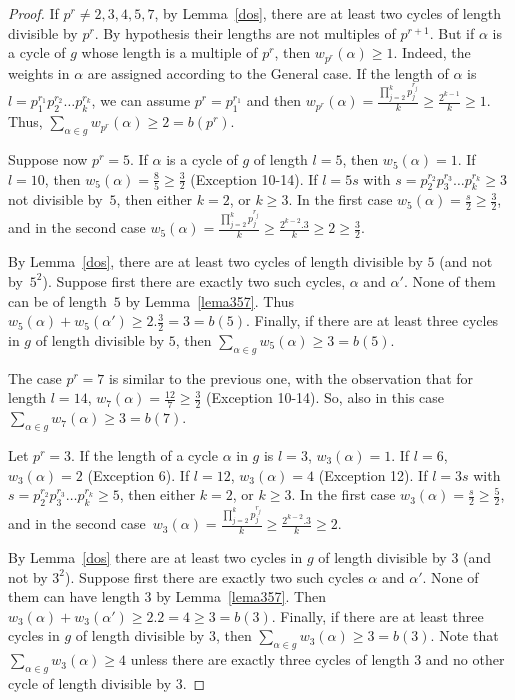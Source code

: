 \documentclass[10pt,a4paper]{amsart}
\renewcommand{\sigma}{g}
\theoremstyle{plain}
\theoremstyle{definition}
\theoremstyle{remark}
\begin{document}
\begin{proof}
If $p^r\neq 2,3,4,5,7$, by Lemma~\ref{dos}, there are at least two cycles of length divisible by $p^r$. By hypothesis their lengths are not multiples of $p^{r+1}$. But if $\alpha$ is a cycle of $\sigma$ whose length is a multiple of $p^r$, then $w_{p^r}(\alpha)\ge 1$. Indeed, the weights in $\alpha$ are assigned according to the General case. If the length of $\alpha$ is $l=p_1^{r_1}p_2^{r_2}\ldots p_k^{r_k}$, we can assume $p^r=p_1^{r_1}$ and then $w_{p^r}(\alpha)=\frac{\prod\limits_{j=2}^k p_j^{r_j}}{k}\ge \frac{2^{k-1}}{k}\ge 1$. Thus, $\sum\limits_{\alpha \in \sigma} w_{p^r}(\alpha)\ge 2= b(p^r)$.

Suppose now $p^r=5$. If $\alpha$ is a cycle of $\sigma$ of length $l=5$, then $w_5(\alpha)=1$. If $l=10$, then $w_5(\alpha)=\frac{8}{5}\ge \frac{3}{2}$ (Exception 10-14). If $l=5s$ with $s=p_2^{r_2}p_3^{r_3}\ldots p_k^{r_k}\ge 3$ not divisible by~$5$, then either $k=2$, or $k\ge 3$. In the first case $w_5(\alpha)=\frac{s}{2}\ge \frac{3}{2}$, and in the second case $w_5(\alpha)=\frac{\prod\limits_{j=2}^k p_j^{r_j}}{k}\ge \frac{2^{k-2}.3}{k}\ge 2\ge \frac{3}{2}$. 

By Lemma~\ref{dos}, there are at least two cycles of length divisible by $5$ (and not by~$5^2$). Suppose first there are exactly two such cycles, $\alpha$ and $\alpha'$. None of them can be of length~$5$ by Lemma~\ref{lema357}. Thus $w_5(\alpha)+w_5(\alpha')\ge 2. \frac{3}{2}= 3=b(5)$. Finally, if there are at least three cycles in $\sigma$ of length divisible by $5$, then $\sum\limits_{\alpha \in \sigma} w_{5}(\alpha)\ge 3= b(5)$.

The case $p^r=7$ is similar to the previous one, with the observation that for length $l=14$, $w_7(\alpha)=\frac{12}{7}\ge \frac{3}{2}$ (Exception 10-14). So, also in this case~$\sum\limits_{\alpha \in \sigma} w_{7}(\alpha)\ge 3= b(7)$.

Let $p^r=3$. If the length of a cycle $\alpha$ in $g$ is $l=3$, $w_3(\alpha)=1$. If $l=6$, $w_3(\alpha)=2$ (Exception 6). If $l=12$, $w_3(\alpha)=4$ (Exception 12). If $l=3s$ with $s=p_2^{r_2}p_3^{r_3}\ldots p_k^{r_k}\ge 5$, then either $k=2$, or $k\ge 3$. In the first case $w_3(\alpha)=\frac{s}{2}\ge \frac{5}{2}$, and in the second case~$w_3(\alpha)=\frac{\prod\limits_{j=2}^k p_j^{r_j}}{k}\ge \frac{2^{k-2}.3}{k}\ge 2$.

By Lemma~\ref{dos} there are at least two cycles in $\sigma$ of length divisible by $3$ (and not by $3^2$). Suppose first there are exactly two such cycles $\alpha$ and $\alpha'$. None of them can have length $3$ by Lemma~\ref{lema357}. Then $w_3(\alpha)+w_3(\alpha')\ge 2.2=4\ge 3=b(3)$. Finally, if there are at least three cycles in $\sigma$ of length divisible by $3$, then $\sum\limits_{\alpha \in \sigma} w_{3}(\alpha)\ge 3= b(3)$. Note that $\sum\limits_{\alpha \in \sigma} w_{3}(\alpha)\ge 4$ unless there are exactly three cycles of length $3$ and no other cycle of length divisible by $3$.


\end{proof}
\end{document}
